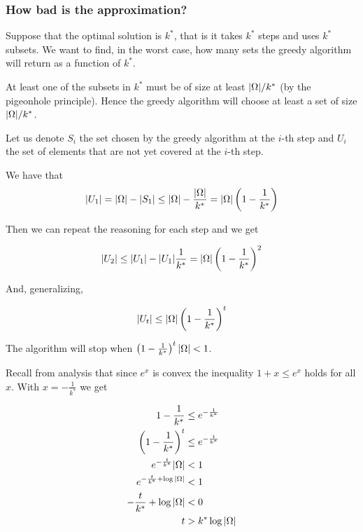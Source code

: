 \documentclass[12pt]{extarticle}
\begin{document}
\subsubsection{How bad is the approximation?}

Suppose that the optimal solution is $k^*$, that is it takes $k^*$ steps and uses $k^*$ subsets.
We want to find, in the worst case, how many sets the greedy algorithm will return as a function of $k^*$.

At least one of the subsets in $k^*$ must be of size at least $\abs{\Omega} / k^*$ (by the pigeonhole principle).
Hence the greedy algorithm will choose at least a set of size $\abs{\Omega} / k^*$.


Let us denote $S_i$ the set chosen by the greedy algorithm at the $i$-th step and $U_i$ the set of elements that are not yet covered at the $i$-th step.

We have that
$$
    \abs{U_1} = \abs{\Omega} - \abs{S_1} \leq \abs{\Omega} - \frac{\abs{\Omega}}{k^*} = \abs{\Omega} \left(1 - \frac{1}{k^*}\right)
$$

Then we can repeat the reasoning for each step and we get

$$
    \abs{U_2} \leq \abs{U_1} - \abs{U_1} \frac{1}{k^*} = \abs{\Omega} \left(1 - \frac{1}{k^*}\right)^2
$$

And, generalizing,

$$
    \abs{U_t} \leq \abs{\Omega} \left(1 - \frac{1}{k^*}\right)^t
$$

The algorithm will stop when $\left(1-\frac{1}{k^*}\right)^t \abs{\Omega} < 1$.

Recall from analysis that since $e^x$ is convex the inequality $1+x \leq e^x$ holds for all $x$.
With $x = -\frac{1}{k^*}$ we get

\begin{align*}
    1-\frac{1}{k^*}                        & \leq e^{-\frac{1}{k^*}} \\
    \left(1-\frac{1}{k^*}\right)^t         & \leq e^{-\frac{t}{k^*}} \\
    e^{-\frac{t}{k^*}} \abs{\Omega}        & < 1                     \\
    e^{-\frac{t}{k^*} + \log \abs{\Omega}} & < 1                     \\
    -\frac{t}{k^*} + \log \abs{\Omega}     & < 0                     \\
    t                                      & > k^* \log \abs{\Omega}
\end{align*}
\end{document}
